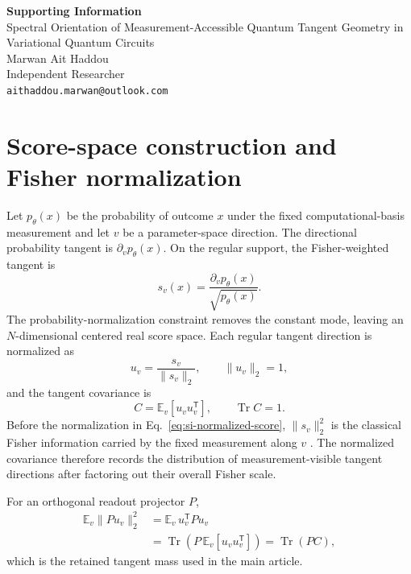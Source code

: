 \documentclass[11pt]{article}
\newcommand{\Tr}{\operatorname{Tr}}
\begin{document}
\begin{center}
{\Large\bfseries Supporting Information}\\[6pt]
{\large Spectral Orientation of Measurement-Accessible Quantum Tangent Geometry in Variational Quantum Circuits}\\[8pt]
Marwan Ait Haddou\\
Independent Researcher\\
\texttt{aithaddou.marwan@outlook.com}
\end{center}

\section{Score-space construction and Fisher normalization}

Let $p_\theta(x)$ be the probability of outcome $x$ under the fixed computational-basis measurement and let $v$ be a parameter-space direction. The directional probability tangent is $\partial_v p_\theta(x)$. On the regular support, the Fisher-weighted tangent is
\begin{equation}
 s_v(x)=\frac{\partial_v p_\theta(x)}{\sqrt{p_\theta(x)}}.
\label{eq:si-score}
\end{equation}
The probability-normalization constraint removes the constant mode, leaving an $N$-dimensional centered real score space. Each regular tangent direction is normalized as
\begin{equation}
 u_v=\frac{s_v}{\|s_v\|_2},\qquad \|u_v\|_2=1,
\label{eq:si-normalized-score}
\end{equation}
and the tangent covariance is
\begin{equation}
 C=\mathbb E_v[u_vu_v^{\mathsf T}],\qquad \Tr C=1.
\label{eq:si-C}
\end{equation}
Before the normalization in Eq.~\eqref{eq:si-normalized-score}, $\|s_v\|_2^2$ is the classical Fisher information carried by the fixed measurement along $v$ \cite{BraunsteinCaves1994,LuLuoOh2012}. The normalized covariance therefore records the distribution of measurement-visible tangent directions after factoring out their overall Fisher scale.

For an orthogonal readout projector $P$,
\begin{align}
\mathbb E_v\|Pu_v\|_2^2
&=\mathbb E_v\,u_v^{\mathsf T}Pu_v \\
&=\Tr\!\left(P\,\mathbb E_v[u_vu_v^{\mathsf T}]\right)
=\Tr(PC),
\label{eq:si-R}
\end{align}
which is the retained tangent mass used in the main article.
\end{document}
